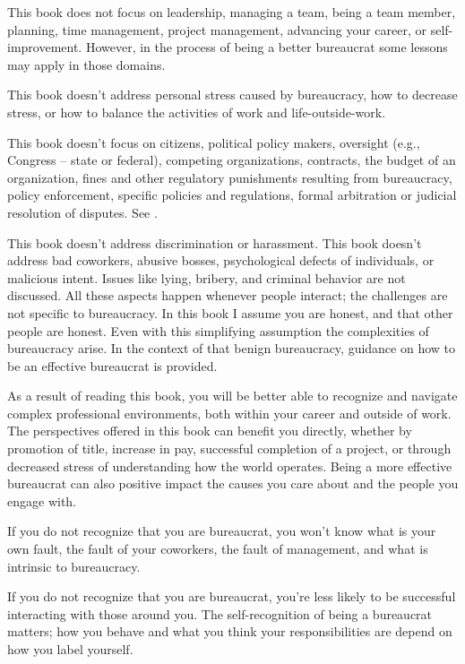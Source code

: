 This book does not focus on leadership, managing a team, being a team member, planning, time management, project management, advancing your career, or self-improvement. However, in the process of being a better bureaucrat some lessons may apply in those domains.

This book doesn't address personal stress caused by bureaucracy, how to decrease stress, or how to balance the activities of work and life-outside-work. 

This book doesn't focus on citizens, political policy makers, oversight (e.g., Congress -- state or federal), competing organizations, contracts, the budget of an organization, fines and other regulatory punishments resulting from bureaucracy, policy enforcement, specific policies and regulations, formal arbitration or judicial resolution of disputes. See \cite{1991_Wilson}.

This book doesn't address discrimination or harassment. This book doesn't address bad coworkers, abusive bosses, psychological defects of individuals, or malicious intent. Issues like lying, bribery, and criminal behavior are not discussed. All these aspects happen whenever people interact; the challenges are not specific to bureaucracy. In this book I assume you are honest, and that other people are honest. Even with this simplifying assumption the complexities of bureaucracy arise. In the context of that benign bureaucracy, guidance on how to be an effective bureaucrat is provided.


As a result of reading this book, you will be better able to recognize and navigate complex professional environments, both within your career and outside of work. The perspectives offered in this book can benefit you directly, whether by promotion of title, increase in pay, successful completion of a project, or through decreased stress of understanding how the world operates. Being a more effective bureaucrat can also positive impact the causes you care about and the people you engage with.

If you do not recognize that you are bureaucrat, you won't know what is your own fault, the fault of your coworkers, the fault of management, and what is intrinsic to bureaucracy. 

If you do not recognize that you are bureaucrat, you're less likely to be successful interacting with those around you. The self-recognition of being a bureaucrat matters; how you behave and what you think your responsibilities are depend on how you label yourself.

